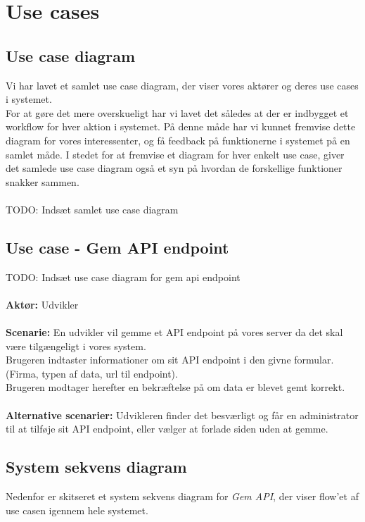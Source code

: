 \section{Use cases}
\subsection{Use case diagram}
Vi har lavet et samlet use case diagram, der viser vores aktører og deres use cases i systemet.\\
For at gøre det mere overskueligt har vi lavet det således at der er indbygget et workflow for hver aktion i systemet.
På denne måde har vi kunnet fremvise dette diagram for vores interessenter, og få feedback på funktionerne i systemet på en samlet måde.
I stedet for at fremvise et diagram for hver enkelt use case, giver det samlede use case diagram  også et syn på hvordan de forskellige funktioner snakker sammen.
\\\\
TODO: Indsæt samlet use case diagram
\subsection{Use case - Gem API endpoint}
TODO: Indsæt use case diagram for gem api endpoint
\\\\
\textbf{Aktør:} Udvikler
\\\\
\textbf{Scenarie:} En udvikler vil gemme et API endpoint på vores server da det skal være tilgængeligt i vores system. \\
Brugeren indtaster informationer om sit API endpoint i den givne formular. (Firma, typen af data, url til endpoint). \\
Brugeren modtager herefter en bekræftelse på om data er blevet gemt korrekt.
\\\\
\textbf{Alternative scenarier:} Udvikleren finder det besværligt og får en administrator til at tilføje sit API endpoint,
eller vælger at forlade siden uden at gemme.
\subsection{System sekvens diagram}
Nedenfor er skitseret et system sekvens diagram for \textit{Gem API}, der viser flow'et af use casen igennem hele systemet.
